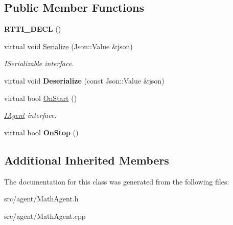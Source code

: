 \subsection*{Public Member Functions}
\begin{DoxyCompactItemize}
\item 
\mbox{\label{class_math_agent_a4ff68fa4a3d84c1e71c02bb1228d66c8}} 
{\bfseries R\+T\+T\+I\+\_\+\+D\+E\+CL} ()
\item 
\mbox{\label{class_math_agent_aefab0596f5dc05df595711141be11207}} 
virtual void \hyperlink{class_math_agent_aefab0596f5dc05df595711141be11207}{Serialize} (Json\+::\+Value \&json)
\begin{DoxyCompactList}\small\item\em I\+Serializable interface. \end{DoxyCompactList}\item 
\mbox{\label{class_math_agent_ae13a7f48d985bfae50016dcdd6b945d0}} 
virtual void {\bfseries Deserialize} (const Json\+::\+Value \&json)
\item 
\mbox{\label{class_math_agent_aa223ebd3da95f4dd29b4db6a1b1a28c7}} 
virtual bool \hyperlink{class_math_agent_aa223ebd3da95f4dd29b4db6a1b1a28c7}{On\+Start} ()
\begin{DoxyCompactList}\small\item\em \hyperlink{class_i_agent}{I\+Agent} interface. \end{DoxyCompactList}\item 
\mbox{\label{class_math_agent_ac95496a25c17d0d56b23dc1d2bf8a86e}} 
virtual bool {\bfseries On\+Stop} ()
\end{DoxyCompactItemize}
\subsection*{Additional Inherited Members}


The documentation for this class was generated from the following files\+:\begin{DoxyCompactItemize}
\item 
src/agent/Math\+Agent.\+h\item 
src/agent/Math\+Agent.\+cpp\end{DoxyCompactItemize}
